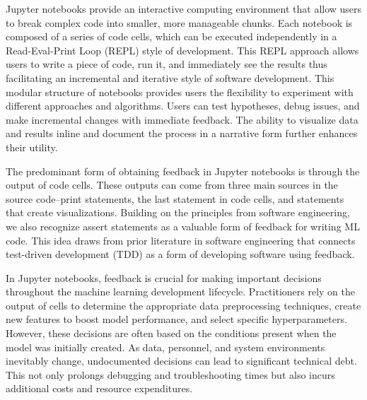 Jupyter notebooks provide an interactive computing environment that allow users to break complex code into smaller, more manageable chunks. Each notebook is composed of a series of code cells, which can be executed independently in a Read-Eval-Print Loop (REPL) style of development. This REPL approach allows users to write a piece of code, run it, and immediately see the results thus facilitating an incremental and iterative style of software development. This modular structure of notebooks provides users the flexibility to experiment with different approaches and algorithms. Users can test hypotheses, debug issues, and make incremental changes with immediate feedback. The ability to visualize data and results inline and document the process in a narrative form further enhances their utility.



The predominant form of obtaining feedback in Jupyter notebooks is through the output of code cells. These outputs can come from three main sources in the source code--print statements, the last statement in code cells, and statements that create visualizations. Building on the principles from software engineering, we also recognize assert statements as a valuable form of feedback for writing ML code. This idea draws from prior literature in software engineering that connects test-driven development (TDD) as a form of developing software using feedback.


In Jupyter notebooks, feedback is crucial for making important decisions throughout the machine learning development lifecycle. Practitioners rely on the output of cells to determine the appropriate data preprocessing techniques, create new features to boost model performance, and select specific hyperparameters. However, these decisions are often based on the conditions present when the model was initially created. As data, personnel, and system environments inevitably change, undocumented decisions can lead to significant technical debt. This not only prolongs debugging and troubleshooting times but also incurs additional costs and resource expenditures.

